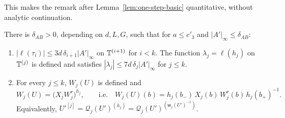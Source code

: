 This makes the remark after Lemma~\ref{lem:one-step-basic} quantitative, without analytic continuation.

\begin{lemma}\label{lem:AB-rep}
There is $\delta_{AB}>0$, depending on $d,L,G$, such that for $a\le c'_3$ and $|A'|_\infty\le\delta_{AB}$:
\begin{enumerate}[label=(\alph*)]
\item $|\ell(\tau_i)|\le3d\,\delta_{i+1}|A'|_\infty$ on $\mathbb T^{(i+1)}$ for $i<k$. The function $\lambda_j=\ell(h_j)$ on $\mathbb T^{(j)}$ is defined and satisfies $|\lambda_j|\le7d\,\delta_j|A'|_\infty$ for $j\le k$.
\item For every $j\le k$, $W_j(U)$ is defined and
\begin{equation}\label{eq:AB-rep}
W_j(U)=\big(X_jW^r_j\big)^{h_j},\qquad\text{i.e.}\quad W_j(U)(b)=h_j(b_-)\,X_j(b)\,W^r_j(b)\,h_j(b_+)^{-1}.
\end{equation}
Equivalently, $U'^{[j]}=\mathcal Q_j(U')^{(h_j)}=\mathcal Q_j(U')^{(\mathsf w_j(U')^{-1})}$.
\end{enumerate}
\end{lemma}

